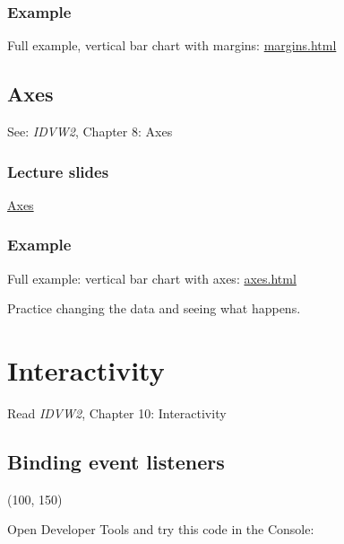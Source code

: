 \documentclass[openany]{book}
\begin{document}
\hypertarget{example}{%
\subsection{Example}\label{example}}

Full example, vertical bar chart with margins: \href{code/margins.html}{margins.html}

\hypertarget{axes}{%
\section{Axes}\label{axes}}

See: \emph{IDVW2}, Chapter 8: Axes

\hypertarget{lecture-slides-3}{%
\subsection{Lecture slides }\label{lecture-slides-3}}

\href{pdfs/axes.pdf}{Axes}

\hypertarget{example-1}{%
\subsection{Example}\label{example-1}}

Full example: vertical bar chart with axes: \href{code/axes.html}{axes.html}

Practice changing the data and seeing what happens.

\hypertarget{interactivity-1}{%
\chapter{Interactivity }\label{interactivity-1}}

Read \emph{IDVW2}, Chapter 10: Interactivity

\hypertarget{binding-event-listeners}{%
\section{Binding event listeners}\label{binding-event-listeners}}

(100, 150)

Open Developer Tools and try this code in the Console:
\end{document}
